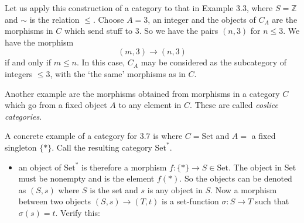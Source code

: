 \documentclass{report}
\begin{document}
\begin{examples}
    \begin{example}[\label{exm:1.3.6}]
        Let us apply this construction of a category to that in Example 3.3, where $S = \mathbb{Z}$ and $\sim $ is the relation $\leq $. Choose $A = 3$, an integer and the objects of $C_{A}$ are the morphisms in $C$ which send stuff to 3. So we have the pairs $(n, 3)$ for $n \leq 3$. We have the morphism
                \begin{equation*}
                    (m, 3) \rightarrow (n, 3)
                \end{equation*}
            if and only if $m \leq n$. In this case, $C_{A}$ may be considered as the subcategory of integers $\leq 3$, with the `the same' morphisms as in $C$.
    \end{example}

    \begin{example}[\label{exm:1.3.7}]
        Another example are the morphisms obtained from morphisms in a category $C$ which go from a fixed object $A$ to any element in $C$. These are called \textit{coslice categories}.
    \end{example}

    \begin{example}[\label{exm:1.3.8}]
        A concrete example of a category for $3.7$ is where $C = \text{Set}$ and $A = $ a fixed singleton $\{*\}$. Call the resulting category $\text{Set}^{*}$.
            \begin{itemize}
                \item an object of $\text{Set}^{*}$ is therefore a morphism $f : \{*\} \rightarrow S \in \text{Set}$. The object in Set must be nonempty and is the element $f(*)$.  So the objects can be denoted as $(S, s)$ where $S$ is the set and $s$ is any object in $S$. Now a morphism between two objects $(S, s) \rightarrow (T, t)$ is a set-function $\sigma : S \rightarrow T$ such that $\sigma(s) = t$. Verify this:


\end{itemize}
\end{example}
\end{examples}
\end{document}
